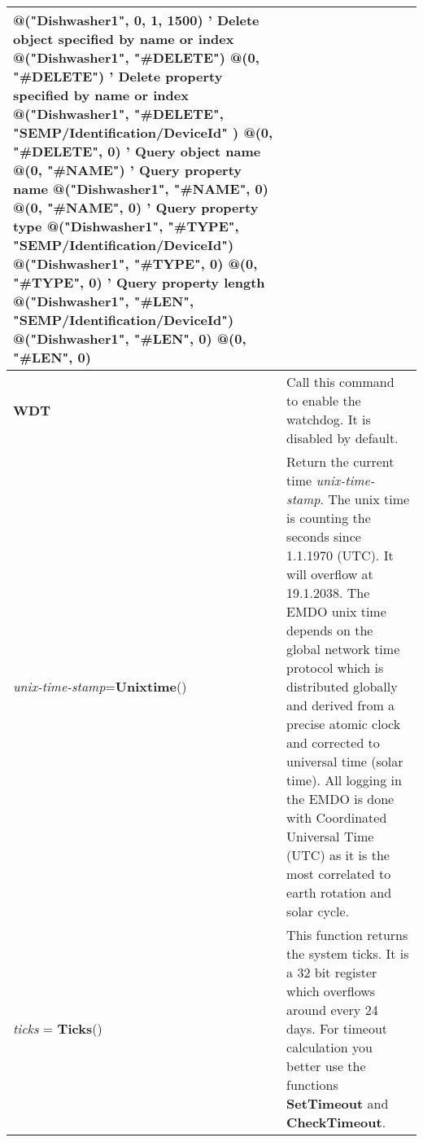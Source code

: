\begin{table}[]
\begin{tabular}{|p{4cm}|p{10cm}|}
\textbf{@}("Dishwasher1", 0, 1, 1500)\newline 
' Delete object specified by name or index\newline
\textbf{@}("Dishwasher1", "\#DELETE")\newline
\textbf{@}(0, "\#DELETE") \newline
' Delete property specified by name or index\newline
\textbf{@}("Dishwasher1", "\#DELETE", "SEMP/Identification/DeviceId" )\newline
\textbf{@}(0, "\#DELETE", 0)\newline
' Query object name\newline
\textbf{@}(0, "\#NAME")\newline 
' Query property name\newline
\textbf{@}("Dishwasher1", "\#NAME", 0)\newline
\textbf{@}(0, "\#NAME", 0)\newline
' Query property type\newline
\textbf{@}("Dishwasher1", "\#TYPE", "SEMP/Identification/DeviceId")\newline
\textbf{@}("Dishwasher1", "\#TYPE", 0)\newline
\textbf{@}(0, "\#TYPE", 0)\newline
' Query property length\newline
\textbf{@}("Dishwasher1", "\#LEN", "SEMP/Identification/DeviceId")\newline
\textbf{@}("Dishwasher1", "\#LEN", 0)\newline
\textbf{@}(0, "\#LEN", 0)
\\ \hline
\textbf{WDT} 
& Call this command to enable the watchdog. It is disabled by default.
\\ \hline
\textit{unix-time-stamp}=\textbf{Unixtime}()
& Return the current time \textit{unix-time-stamp}. The unix time is counting the seconds since 1.1.1970 (UTC). It will overflow at 19.1.2038. The EMDO unix time depends on the global network time protocol which is distributed globally and derived from a precise atomic clock and corrected to universal time (solar time). All logging in the EMDO is done with Coordinated Universal Time (UTC) as it is the most correlated to earth rotation and solar cycle.
\\ \hline
\textit{ticks} = \textbf{Ticks}() 
& This function returns the system ticks. It is a 32 bit register which overflows around every 24 days. For timeout calculation you better use the functions \textbf{SetTimeout} and \textbf{CheckTimeout}.

\end{tabular}
\end{table}
